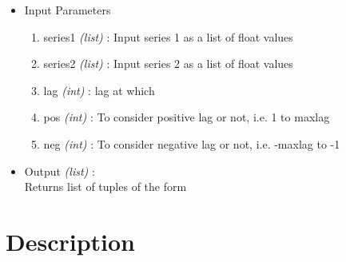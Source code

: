 \begin{itemize}
 \item Input Parameters
 
 \begin{enumerate}
  \item series1 \textit{(list)} : Input series 1 as a list of float values
  \item series2 \textit{(list)} : Input series 2 as a list of float values
  \item lag \textit{(int)} : lag at which
  \item pos \textit{(int)} : To consider positive lag or not, i.e. 1 to maxlag
  \item neg \textit{(int)} : To consider negative lag or not, i.e. -maxlag to -1
 \end{enumerate}

 \item Output \textit{(list)} : \\
  Returns list of tuples of the form \\
 
\end{itemize}


\section{Description}